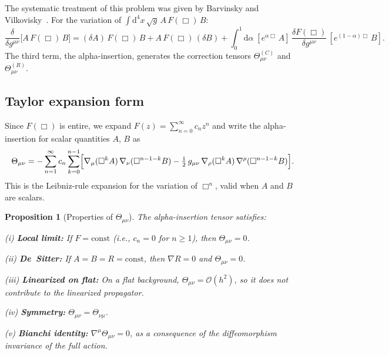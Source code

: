 \documentclass[12pt,a4paper]{article}
\newcommand{\dd}{\mathrm{d}}
\newcommand{\order}{\mathcal{O}}
\theoremstyle{plain}
\newtheorem{proposition}[theorem]{Proposition}
\theoremstyle{definition}
\begin{document}
The systematic treatment of this problem was given by Barvinsky and
Vilkovisky~\cite{Barvinsky:1985an,Barvinsky:1990up}.
For the variation of $\int\dd^4x\,\sqrt{g}\,A\,F(\Box)\,B$:
\begin{equation}\label{eq:BV-alpha}
  \frac{\delta}{\delta g^{\mu\nu}}\bigl[A\,F(\Box)\,B\bigr]
  = (\delta A)\,F(\Box)\,B + A\,F(\Box)\,(\delta B)
  + \int_0^1\dd\alpha\;
  [e^{\alpha\Box}\,A]\,
  \frac{\delta F(\Box)}{\delta g^{\mu\nu}}\,
  [e^{(1-\alpha)\Box}\,B].
\end{equation}
The third term, the alpha-insertion, generates the correction tensors
$\Theta^{(C)}_{\mu\nu}$ and $\Theta^{(R)}_{\mu\nu}$.

\subsection{Taylor expansion form}

Since $F(\Box)$ is entire, we expand $F(z) = \sum_{n=0}^{\infty} c_n z^n$
and write the alpha-insertion for scalar quantities $A$, $B$ as
\begin{equation}\label{eq:Theta-Taylor}
  \Theta_{\mu\nu} = -\sum_{n=1}^{\infty} c_n
  \sum_{k=0}^{n-1}
  \Bigl[\nabla_\mu(\Box^k A)\,\nabla_\nu(\Box^{n-1-k} B)
  - \tfrac{1}{2}\,g_{\mu\nu}\,\nabla_\rho(\Box^k A)\,
  \nabla^\rho(\Box^{n-1-k} B)\Bigr].
\end{equation}
This is the Leibniz-rule expansion for the variation of $\Box^n$, valid when
$A$ and $B$ are scalars.

\begin{proposition}[Properties of $\Theta_{\mu\nu}$]
\label{prop:theta-props}
The alpha-insertion tensor satisfies:\smallskip

\noindent
(i) \textbf{Local limit:}  If $F = \mathrm{const}$ (i.e., $c_n = 0$ for
$n \geq 1$), then $\Theta_{\mu\nu} = 0$.\smallskip

\noindent
(ii) \textbf{De~Sitter:}  If $A = B = R = \mathrm{const}$, then
$\nabla R = 0$ and $\Theta_{\mu\nu} = 0$.\smallskip

\noindent
(iii) \textbf{Linearized on flat:}  On a flat background,
$\Theta_{\mu\nu} = \order(h^2)$, so it does not contribute to the
linearized propagator.\smallskip

\noindent
(iv) \textbf{Symmetry:}  $\Theta_{\mu\nu} = \Theta_{\nu\mu}$.\smallskip

\noindent
(v) \textbf{Bianchi identity:}  $\nabla^\mu\Theta_{\mu\nu} = 0$, as a
consequence of the diffeomorphism invariance of the full action.
\end{proposition}
\end{document}
